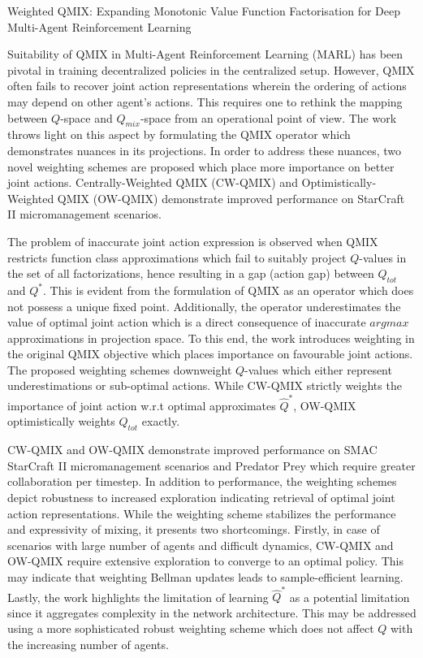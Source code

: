 \documentclass[11pt,letterpaper]{article}
\begin{document}
\begin{center}
  \large{Weighted QMIX: Expanding Monotonic Value
  Function Factorisation for Deep Multi-Agent
  Reinforcement Learning}
\end{center}

Suitability of QMIX in Multi-Agent Reinforcement Learning (MARL) has been pivotal in training decentralized policies in the centralized setup. However, QMIX often fails to recover joint action representations wherein the ordering of actions may depend on other agent's actions. This requires one to rethink the mapping between $Q$-space and $Q_{mix}$-space from an operational point of view. The work throws light on this aspect by formulating the QMIX operator which demonstrates nuances in its projections. In order to address these nuances, two novel weighting schemes are proposed which place more importance on better joint actions. Centrally-Weighted QMIX (CW-QMIX) and Optimistically-Weighted QMIX (OW-QMIX) demonstrate improved performance on StarCraft II micromanagement scenarios. 

The problem of inaccurate joint action expression is observed when QMIX restricts function class approximations which fail to suitably project $Q$-values in the set of all factorizations, hence resulting in a gap (action gap) between $Q_{tot}$ and $Q^{*}$. This is evident from the formulation of QMIX as an operator which does not possess a unique fixed point. Additionally, the operator underestimates the value of optimal joint action which is a direct consequence of inaccurate $argmax$ approximations in projection space. To this end, the work introduces weighting in the original QMIX objective which places importance on favourable joint actions. The proposed weighting schemes downweight $Q$-values which either represent underestimations or sub-optimal actions. While CW-QMIX strictly weights the importance of joint action w.r.t optimal approximates $\hat{Q}^{*}$, OW-QMIX optimistically weights $Q_{tot}$ exactly. 

CW-QMIX and OW-QMIX demonstrate improved performance on SMAC StarCraft II micromanagement scenarios and Predator Prey which require greater collaboration per timestep. In addition to performance, the weighting schemes depict robustness to increased exploration indicating retrieval of optimal joint action representations. While the weighting scheme stabilizes the performance and expressivity of mixing, it presents two shortcomings. Firstly, in case of scenarios with large number of agents and difficult dynamics, CW-QMIX and OW-QMIX require extensive exploration to converge to an optimal policy. This may indicate that weighting Bellman updates leads to sample-efficient learning. Lastly, the work highlights the limitation of learning $\hat{Q}^{*}$ as a potential limitation since it aggregates complexity in the network architecture. This may be addressed using a more sophisticated robust weighting scheme which does not affect $Q$ with the increasing number of agents. 
\end{document}
